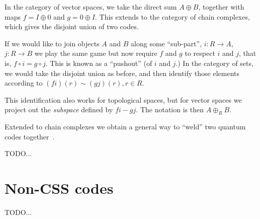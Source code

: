In the category of vector spaces, we take the direct sum $A\oplus B$, together
with maps $f=I\oplus 0$ and $g=0\oplus I.$
This extends to the category of chain complexes, which 
gives the disjoint union of two codes.

If we would like to join objects $A$ and $B$ along some
``sub-part'', $i:R\to A$, $j:R\to B$ we play the same game
but now require $f$ and $g$ to respect $i$ and $j$, that is,
$f\circ i = g\circ j.$ This is known as a ``pushout'' (of $i$ and $j$.)
In the category of sets, we would take the disjoint union as
before, and then identify those elements according to $(fi)(r) \sim (gj)(r), r\in R.$

This identification also works for topological spaces,
but for vector spaces we project out the {\it subspace} defined
by $fi - gj.$ The notation is then $A\oplus_R B.$

Extended to chain complexes we obtain a general way to
``weld'' two quantum codes together~\cite{Michnicki12}.

TODO...

\section{Non-CSS codes}

TODO...




